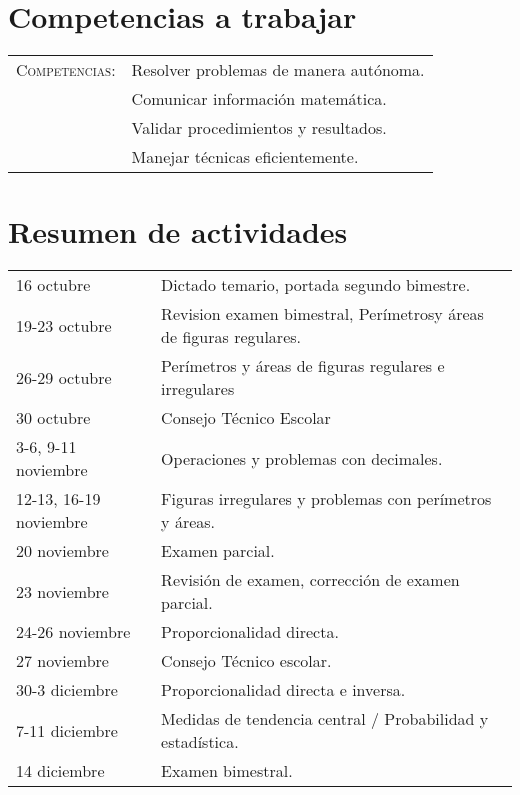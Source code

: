 \documentclass[letterpaper,10pt]{article}
\begin{document}
\section{Competencias a trabajar}
\begin{tabular}[t]{R{0.25\textwidth}p{0.71\textwidth}}
    \textsc{Competencias: } &   Resolver problemas de manera aut\'onoma. \\ 
                            &   Comunicar información matem\'atica. \\
                            &   Validar procedimientos y resultados. \\
                            &   Manejar t\'ecnicas eficientemente. \\
\end{tabular}

\section{Resumen de actividades}
\begin{tabular}[t]{R{0.25\textwidth}p{0.71\textwidth}}
16 octubre      & Dictado temario, portada segundo bimestre. \\
19-23 octubre   & Revision examen bimestral, Per\'imetrosy 
                  \'areas de figuras regulares. \\
26-29 octubre   & Per\'imetros y \'areas de figuras regulares e irregulares \\
30 octubre      & Consejo T\'ecnico Escolar \\
3-6, 9-11 noviembre   & Operaciones y problemas con decimales. \\
12-13, 16-19 noviembre & Figuras irregulares y problemas con per\'imetros y \'areas. \\
20 noviembre    & Examen parcial. \\
23 noviembre    & Revisi\'on de examen, correcci\'on de examen parcial. \\
24-26 noviembre & Proporcionalidad directa. \\
27 noviembre    & Consejo T\'ecnico escolar. \\
30-3 diciembre  & Proporcionalidad directa e inversa. \\
7-11 diciembre  & Medidas de tendencia central / Probabilidad y estad\'istica. \\
14 diciembre    & Examen bimestral. \\
\end{tabular}

\newpage
\end{document}
